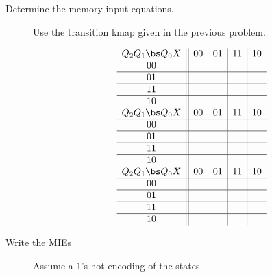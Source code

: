 \begin{description}
    \item[Determine the memory input equations.]  Use the transition
        kmap given in the previous problem.

        $$
        \begin{array}{c}
            \begin{array} {c||c|c|c|c}
                Q_2 Q_1 \bs Q_0 X    &  00 &  01 &  11 &  10 \\ \hline
                00                & & & &  \\ \hline
                01                & & & &  \\ \hline
                11                & & & &  \\ \hline
                10                & & & &  \\
            \end{array} \\

            \begin{array} {c||c|c|c|c}
                Q_2 Q_1 \bs Q_0 X    &  00 &  01 &  11 &  10 \\ \hline
                00                & & & &  \\ \hline
                01                & & & &  \\ \hline
                11                & & & &  \\ \hline
                10                & & & &  \\
            \end{array} \\

            \begin{array} {c||c|c|c|c}
                Q_2 Q_1 \bs Q_0 X    &  00 &  01 &  11 &  10 \\ \hline
                00                & & & &  \\ \hline
                01                & & & &  \\ \hline
                11                & & & &  \\ \hline
                10                & & & &  \\
            \end{array}

        \end{array} $$
        \pagebreak

    \item[Write the MIEs]  Assume a 1's hot encoding of the states.


\end{description}
